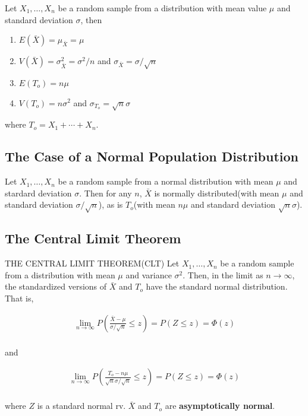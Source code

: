 \begin{proposition}
    Let $X_1,\dots,X_n$ be a random sample from a distribution with mean value $\mu$ and standard deviation $\sigma$, then 

    \begin{enumerate}
        \item $E(\bar{X}) = \mu_{\bar{X}} = \mu$
        \item $V(\bar{X}) = \sigma_{\bar{X}}^2 = \sigma^2/n$ and $\sigma_{\bar{X}} = \sigma / \sqrt{n}$
        \item $E(T_o) = n\mu$
        \item $V(T_o) = n\sigma^2$ and $\sigma_{T_o} = \sqrt{n}\sigma$
    \end{enumerate}

    where $T_o = X_1 + \cdots + X_n$.
\end{proposition}

\subsection{The Case of a Normal Population Distribution}

\begin{proposition}
    Let $X_1,\dots,X_n$ be a random sample from a normal distribution with mean $\mu$ and stardard deviation $\sigma$. Then for any $n$, $\bar{X}$ is normally distributed(with mean $\mu$ and standard deviation $\sigma/\sqrt{n}$), as is $T_o$(with mean $n\mu$ and standard deviation $\sqrt{n}\sigma$).
\end{proposition}

\subsection{The Central Limit Theorem}

\begin{theorem}{THE CENTRAL LIMIT THEOREM(CLT)}
    Let $X_1,\dots,X_n$ be a random sample from a distribution with mean $\mu$ and variance $\sigma^2$. Then, in the limit as $n\rightarrow\infty$, the standardized versions of $\bar{X}$ and $T_o$ have the standard normal distribution. That is, 

    \begin{align*}
        \lim_{n\rightarrow\infty}P\left(\frac{\bar{X}-\mu}{\sigma/\sqrt{n}}\leq z\right) = P(Z\leq z)=\Phi(z) \\
    \end{align*}
    
    and 
    
    \begin{align*}
        \lim_{n\rightarrow\infty}P\left(\frac{T_o-n\mu}{\sqrt{n}\sigma/\sqrt{n}}\leq z\right) = P(Z\leq z)=\Phi(z) \\
    \end{align*}

    where $Z$ is a standard normal rv. $\bar{X}$ and $T_o$ are \textbf{asymptotically normal}.
\end{theorem}

